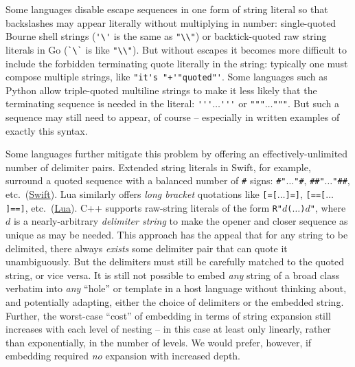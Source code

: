Some languages disable escape sequences in one form of string literal
so that backslashes may appear literally without multiplying in number:
\eg single-quoted Bourne shell strings (\verb|'\'| is the same as \verb|"\\"|)
or backtick-quoted raw string literals
in Go (\verb|`\`| is like \verb|"\\"|).
But without escapes it becomes more difficult to include
the forbidden terminating quote literally in the string:
typically one must compose multiple strings,
like \verb|"it's "+'"quoted"'|.
Some languages such as Python allow triple-quoted multiline strings
to make it less likely that the terminating sequence is needed in the literal:
\eg \verb|'''|$\dots$\verb|'''| or \verb|"""|$\dots$\verb|"""|.
But such a sequence may still need to appear, of course --
especially in written examples of exactly this syntax.

Some languages further mitigate this problem
by offering an effectively-unlimited number of delimiter pairs.
Extended string literals in Swift, for example,
surround a quoted sequence with a balanced number of \verb|#| signs:
\eg \verb|#"|$\dots$\verb|"#|, \verb|##"|$\dots$\verb|"##|, etc.\
(\href{https://docs.swift.org/swift-book/LanguageGuide/StringsAndCharacters.html#ID286}{Swift}).
Lua
similarly offers \emph{long bracket} quotations
like \verb|[=[|$\dots$\verb|]=]|, \verb|[==[|$\dots$\verb|]==]|, etc.\
(\href{https://www.lua.org/manual/5.1/manual.html}{Lua}).
C++ supports raw-string literals of the form
\verb|R"|$d$\verb|(|$\dots$\verb|)|$d$\verb|"|,
where $d$ is a nearly-arbitrary \emph{delimiter string}
to make the opener and closer sequence as unique as may be needed.
This approach has the appeal that for any string to be delimited,
there always \emph{exists} some delimiter pair
that can quote it unambiguously.
But the delimiters must still be carefully matched to the quoted string,
or vice versa.
It is still not possible to embed \emph{any} string of a broad class
verbatim into \emph{any} ``hole'' or template in a host language
without thinking about, and potentially adapting,
either the choice of delimiters or the embedded string.
Further, the worst-case ``cost'' of embedding in terms of string expansion
still increases with each level of nesting --
in this case
at least only linearly, rather than exponentially, in the number of levels.
We would prefer, however, if embedding
required \emph{no} expansion with increased depth.



